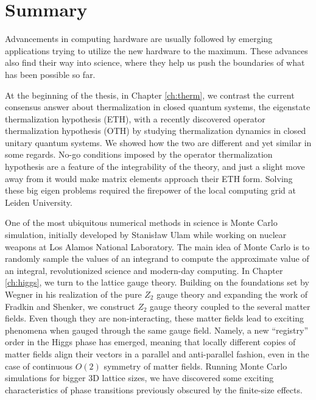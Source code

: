 \newpage
\thispagestyle{empty}

\chapter*{Summary}
\label{Summary}

Advancements in computing hardware are usually followed by emerging applications trying to utilize the new hardware to the maximum. These advances also find their way into science, where they help us push the boundaries of what has been possible so far. 

At the beginning of the thesis, in Chapter \ref{ch:therm}, we contrast the current consensus answer about thermalization in closed quantum systems, the eigenstate thermalization hypothesis (ETH), with a recently discovered operator thermalization hypothesis (OTH) by studying thermalization dynamics in closed unitary quantum systems. We showed how the two are different and yet similar in some regards. No-go conditions imposed by the operator thermalization hypothesis are a feature of the integrability of the theory, and just a slight move away from it would make matrix elements approach their ETH form. Solving these big eigen problems required the firepower of the local computing grid at Leiden University.

One of the most ubiquitous numerical methods in science is Monte Carlo simulation, initially developed by Stanisław Ulam while working on nuclear weapons at Los Alamos National Laboratory. The main idea of Monte Carlo is to randomly sample the values of an integrand to compute the approximate value of an integral, revolutionized science and modern-day computing. In Chapter \ref{ch:higgs}, we turn to the lattice gauge theory. Building on the foundations set by Wegner in his realization of the pure $Z_2$ gauge theory and expanding the work of Fradkin and Shenker, we construct $Z_2$ gauge theory coupled to the several matter fields. Even though they are non-interacting, these matter fields lead to exciting phenomena when gauged through the same gauge field. Namely, a new ``registry'' order in the Higgs phase has emerged, meaning that locally different copies of matter fields align their vectors in a parallel and anti-parallel fashion, even in the case of continuous $O(2)$ symmetry of matter fields. Running Monte Carlo simulations for bigger 3D lattice sizes, we have discovered some exciting characteristics of phase transitions previously obscured by the finite-size effects.      

